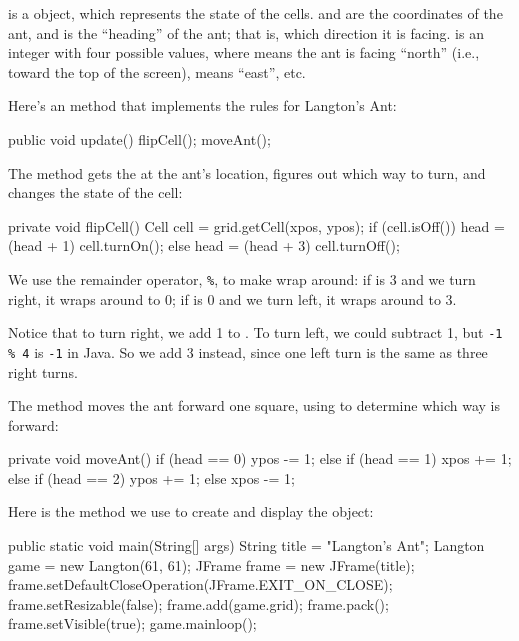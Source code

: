 
 is a  object, which represents the state of the cells.
 and  are the coordinates of the ant, and  is the ``heading'' of the ant; that is, which direction it is facing.
 is an integer with four possible values, where  means the ant is facing ``north'' (i.e., toward the top of the screen),  means ``east'', etc.

Here's an  method that implements the rules for Langton's Ant:

\begin{code}
public void update() {
    flipCell();
    moveAnt();
}
\end{code}

The  method gets the  at the ant's location, figures out which way to turn, and changes the state of the cell:

\begin{code}
private void flipCell() {
    Cell cell = grid.getCell(xpos, ypos);
    if (cell.isOff()) {
        head = (head + 1) %
        cell.turnOn();
    } else {
        head = (head + 3) %
        cell.turnOff();
    }
}
\end{code}

We use the remainder operator, \verb"%", to make  wrap around: if  is 3 and we turn right, it wraps around to 0; if  is 0 and we turn left, it wraps around to 3.

Notice that to turn right, we add 1 to .
To turn left, we could subtract 1, but \verb"-1 % 4" is \verb"-1" in Java.
So we add 3 instead, since one left turn is the same as three right turns.

The  method moves the ant forward one square, using  to determine which way is forward:

\begin{code}
private void moveAnt() {
    if (head == 0) {
        ypos -= 1;
    } else if (head == 1) {
        xpos += 1;
    } else if (head == 2) {
        ypos += 1;
    } else {
        xpos -= 1;
    }
}
\end{code}

Here is the  method we use to create and display the  object:

\begin{code}
public static void main(String[] args) {
    String title = "Langton's Ant";
    Langton game = new Langton(61, 61);
    JFrame frame = new JFrame(title);
    frame.setDefaultCloseOperation(JFrame.EXIT_ON_CLOSE);
    frame.setResizable(false);
    frame.add(game.grid);
    frame.pack();
    frame.setVisible(true);
    game.mainloop();
}
\end{code}

